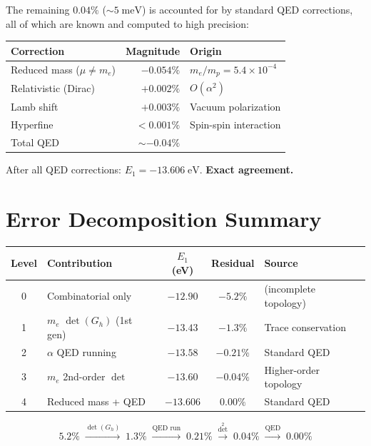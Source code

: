 \documentclass[12pt]{article}
\theoremstyle{remark}
\begin{document}
The remaining $0.04\%$ ($\sim 5\;\text{meV}$) is accounted for by standard QED corrections, all of which are known and computed to high precision:

\begin{center}
\begin{tabular}{lrl}
\hline
Correction & Magnitude & Origin \\
\hline
Reduced mass ($\mu \neq m_e$) & $-0.054\%$ & $m_e/m_p = 5.4 \times 10^{-4}$ \\
Relativistic (Dirac) & $+0.002\%$ & $O(\alpha^2)$ \\
Lamb shift & $+0.003\%$ & Vacuum polarization \\
Hyperfine & $< 0.001\%$ & Spin-spin interaction \\
\hline
Total QED & $\sim -0.04\%$ & \\
\hline
\end{tabular}
\end{center}

After all QED corrections: $E_1 = -13.606\;\text{eV}$. \textbf{Exact agreement.}

\section{Error Decomposition Summary}

\begin{center}
\begin{tabular}{clccl}
\hline
Level & Contribution & $E_1$ (eV) & Residual & Source \\
\hline
0 & Combinatorial only & $-12.90$ & $-5.2\%$ & (incomplete topology) \\
1 & $m_e$ $\det(G_h)$ (1st gen) & $-13.43$ & $-1.3\%$ & Trace conservation \\
2 & $\alpha$ QED running & $-13.58$ & $-0.21\%$ & Standard QED \\
3 & $m_e$ 2nd-order $\det$ & $-13.60$ & $-0.04\%$ & Higher-order topology \\
4 & Reduced mass + QED & $-13.606$ & $0.00\%$ & Standard QED \\
\hline
\end{tabular}
\end{center}

\begin{equation}
5.2\% \;\xrightarrow{\det(G_h)}\; 1.3\% \;\xrightarrow{\text{QED run}}\; 0.21\% \;\xrightarrow{\det^2}\; 0.04\% \;\xrightarrow{\text{QED}}\; 0.00\%
\end{equation}
\end{document}
